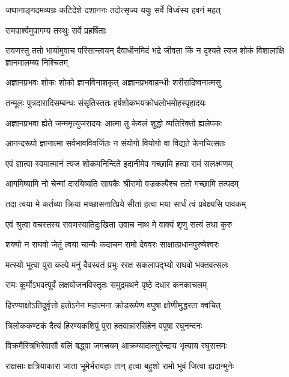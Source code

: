\twolineshloka
{जघानाङ्गदमव्यग्रः कटिदेशे दशाननः}
{तदोत्सृज्य ययुः सर्वे विध्वंस्य हवनं महत्} %

{रामपार्श्वमुपागम्य तस्थुः सर्वे प्रहर्षिताः} %


\threelineshloka
{रावणस्तु ततो भार्यामुवाच परिसान्त्वयन्}
{दैवाधीनमिदं भद्रे जीवता किं न दृश्यते}
{त्यज शोकं विशालाक्षि ज्ञानमालम्ब्य निश्चितम्} %

\twolineshloka
{अज्ञानप्रभवः शोकः शोको ज्ञानविनाशकृत्}
{अज्ञानप्रभवाहन्धीः शरीरादिष्वनात्मसु} %

\twolineshloka
{तन्मूलः पुत्रदारादिसम्बन्धः संसृतिस्ततः}
{हर्षशोकभयक्रोधलोभमोहस्पृहादयः} %

\twolineshloka
{अज्ञानप्रभवा ह्येते जन्ममृत्युजरादयः}
{आत्मा तु केवलं शुद्धो व्यतिरिक्तो ह्यलेपकः} %

\twolineshloka
{आनन्दरूपो ज्ञानात्मा सर्वभावविवर्जितः}
{न संयोगो वियोगो वा विद्यते केनचित्सतः} %

\twolineshloka
{एवं ज्ञात्वा स्वमात्मानं त्यज शोकमनिन्दिते}
{इदानीमेव गच्छामि हत्वा रामं सलक्ष्मणम्} %

\twolineshloka
{आगमिष्यामि नो चेन्मां दारयिष्यति सायकैः}
{श्रीरामो वज्रकल्पैश्च ततो गच्छामि तत्पदम्} %

\twolineshloka
{तदा त्वया मे कर्तव्या क्रिया मच्छासनात्प्रिये}
{सीतां हत्वा मया सार्धं त्वं प्रवेक्ष्यसि पावकम्} %

\twolineshloka
{एवं श्रुत्वा वचस्तस्य रावणस्यातिदुःखिता}
{उवाच नाथ मे वाक्यं शृणु सत्यं तथा कुरु} %

\twolineshloka
{शक्यो न राघवो जेतुं त्वया चान्यैः कदाचन}
{रामो देववरः साक्षात्प्रधानपुरुषेश्वरः} %

\twolineshloka
{मत्स्यो भूत्वा पुरा कल्पे मनुं वैवस्वतं प्रभुः}
{ररक्ष सकलापद्भ्यो राघवो भक्तवत्सलः} %

\twolineshloka
{रामः कूर्मोऽभवत्पूर्वं लक्षयोजनविस्तृतः}
{समुद्रमथने पृष्ठे दधार कनकाचलम्} %

\twolineshloka
{हिरण्याक्षोऽतिदुर्वृत्तो हतोऽनेन महात्मना}
{क्रोडरूपेण वपुषा क्षोणीमुद्धरता क्वचित्} %

\twolineshloka
{त्रिलोककण्टकं दैत्यं हिरण्यकशिपुं पुरा}
{हतवान्नारसिंहेन वपुषा रघुनन्दनः} %

\twolineshloka
{विक्रमैस्त्रिभिरेवासौ बलिं बद्ध्वा जगत्त्रयम्}
{आक्रम्यादात्सुरेन्द्राय भृत्याय रघुसत्तमः} %

\twolineshloka
{राक्षसाः क्षत्रियाकारा जाता भूमेर्भरावहाः}
{तान् हत्वा बहुशो रामो भुवं जित्वा ह्यदान्मुनेः} %

